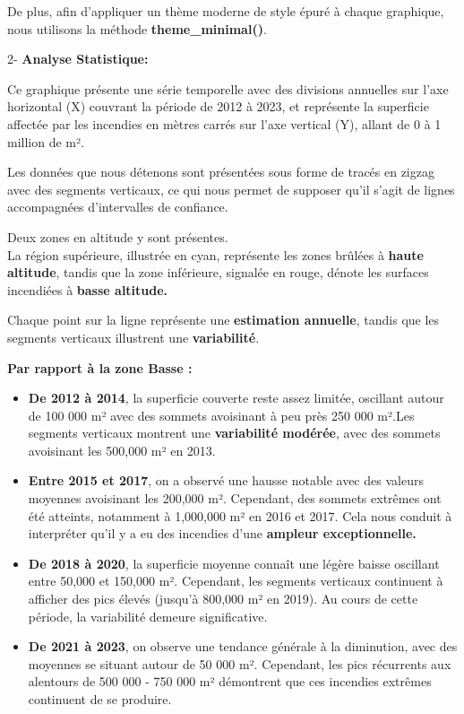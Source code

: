\documentclass[
]{article}
\begin{document}
De plus, afin d'appliquer un thème moderne de style épuré à chaque
graphique, nous utilisons la méthode \textbf{theme\_minimal()}.

2- \textbf{Analyse Statistique:}

Ce graphique présente une série temporelle avec des divisions annuelles
sur l'axe horizontal (X) couvrant la période de 2012 à 2023, et
représente la superficie affectée par les incendies en mètres carrés sur
l'axe vertical (Y), allant de 0 à 1 million de m².

Les données que nous détenons sont présentées sous forme de tracés en
zigzag avec des segments verticaux, ce qui nous permet de supposer qu'il
s'agit de lignes accompagnées d'intervalles de confiance.

Deux zones en altitude y sont présentes.\\
La région supérieure, illustrée en cyan, représente les zones brûlées à
\textbf{haute altitude}, tandis que la zone inférieure, signalée en
rouge, dénote les surfaces incendiées à \textbf{basse altitude.}

Chaque point sur la ligne représente une \textbf{estimation annuelle},
tandis que les segments verticaux illustrent une \textbf{variabilité}.

\textbf{Par rapport à la zone Basse :}

\begin{itemize}
\item
  \textbf{De 2012 à 2014}, la superficie couverte reste assez limitée,
  oscillant autour de 100 000 m² avec des sommets avoisinant à peu près
  250 000 m².Les segments verticaux montrent une \textbf{variabilité
  modérée}, avec des sommets avoisinant les 500,000 m² en 2013.
\item
  \textbf{Entre 2015 et 2017}, on a observé une hausse notable avec des
  valeurs moyennes avoisinant les 200,000 m². Cependant, des sommets
  extrêmes ont été atteints, notamment à 1,000,000 m² en 2016 et 2017.
  Cela nous conduit à interpréter qu'il y a eu des incendies d'une
  \textbf{ampleur exceptionnelle.}
\item
  \textbf{De 2018 à 2020}, la superficie moyenne connaît une légère
  baisse oscillant entre 50,000 et 150,000 m². Cependant, les segments
  verticaux continuent à afficher des pics élevés (jusqu'à 800,000 m² en
  2019). Au cours de cette période, la variabilité demeure
  significative.
\item
  \textbf{De 2021 à 2023}, on observe une tendance générale à la
  diminution, avec des moyennes se situant autour de 50 000 m².
  Cependant, les pics récurrents aux alentours de 500 000 - 750 000 m²
  démontrent que ces incendies extrêmes continuent de se produire.
\end{itemize}
\end{document}
